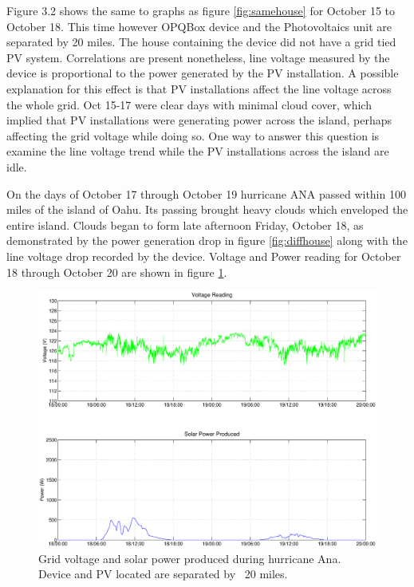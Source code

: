 Figure 3.2 shows the same to graphs as figure \ref{fig:samehouse} for October 15 to October 18. This time however OPQBox device and the Photovoltaics unit are separated by 20 miles. The house containing the device did not have a grid tied PV system. Correlations are present nonetheless, line voltage measured by the device is proportional to the power generated by the PV installation. A possible explanation for this effect is that PV installations affect the line voltage across the whole grid. Oct 15-17 were clear days with minimal cloud cover, which implied that PV installations were generating power across the island, perhaps affecting the grid voltage while doing so. One way to answer this question is examine the line voltage trend while the PV installations
across the island are idle. 

On the days of October 17 through October 19 hurricane ANA passed within 100 miles of the island of Oahu. Its passing brought heavy clouds which enveloped the entire island. Clouds began to form late afternoon Friday, October 18, as demonstrated by the power generation drop in figure \ref{fig:diffhouse} along with the line voltage drop recorded by the device. Voltage and Power reading for October 18 through October 20 are shown in figure \ref{fig:storm}.

\begin{figure}[h!]
\centering
\includegraphics[width=\textwidth]{img/Stormy.eps}
\caption{Grid voltage and solar power produced during hurricane Ana. Device and PV located are separated by ~20 miles.}
\label{fig:storm}
\end{figure} 


